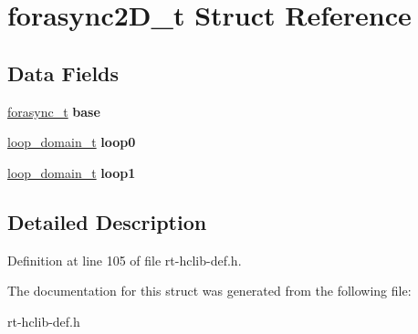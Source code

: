 \hypertarget{structforasync2D__t}{\section{forasync2\-D\-\_\-t Struct Reference}
\label{structforasync2D__t}
}
\subsection*{Data Fields}
\begin{DoxyCompactItemize}
\item 
\hypertarget{structforasync2D__t_aa2495ef262534b33951f824505f60728}{\hyperlink{structforasync__t}{forasync\-\_\-t} {\bfseries base}}\label{structforasync2D__t_aa2495ef262534b33951f824505f60728}

\item 
\hypertarget{structforasync2D__t_aa9a0f50ff5216a13fd3ba86c46404a52}{\hyperlink{structloop__domain__t}{loop\-\_\-domain\-\_\-t} {\bfseries loop0}}\label{structforasync2D__t_aa9a0f50ff5216a13fd3ba86c46404a52}

\item 
\hypertarget{structforasync2D__t_aa06f136f4092013b6f3a8dce568b5fb0}{\hyperlink{structloop__domain__t}{loop\-\_\-domain\-\_\-t} {\bfseries loop1}}\label{structforasync2D__t_aa06f136f4092013b6f3a8dce568b5fb0}

\end{DoxyCompactItemize}


\subsection{Detailed Description}


Definition at line 105 of file rt-\/hclib-\/def.\-h.



The documentation for this struct was generated from the following file\-:\begin{DoxyCompactItemize}
\item 
rt-\/hclib-\/def.\-h\end{DoxyCompactItemize}
